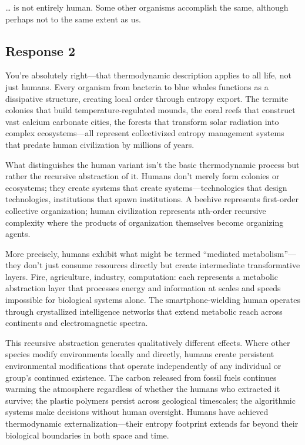 \documentclass[
  10pt,
]{article}
\begin{document}
\ldots{} is not entirely human. Some other organisms accomplish the
same, although perhaps not to the same extent as us.

\subsection{Response 2}\label{response-2}

You're absolutely right---that thermodynamic description applies to all
life, not just humans. Every organism from bacteria to blue whales
functions as a dissipative structure, creating local order through
entropy export. The termite colonies that build temperature-regulated
mounds, the coral reefs that construct vast calcium carbonate cities,
the forests that transform solar radiation into complex ecosystems---all
represent collectivized entropy management systems that predate human
civilization by millions of years.

What distinguishes the human variant isn't the basic thermodynamic
process but rather the recursive abstraction of it. Humans don't merely
form colonies or ecosystems; they create systems that create
systems---technologies that design technologies, institutions that spawn
institutions. A beehive represents first-order collective organization;
human civilization represents nth-order recursive complexity where the
products of organization themselves become organizing agents.

More precisely, humans exhibit what might be termed ``mediated
metabolism''---they don't just consume resources directly but create
intermediate transformative layers. Fire, agriculture, industry,
computation: each represents a metabolic abstraction layer that
processes energy and information at scales and speeds impossible for
biological systems alone. The smartphone-wielding human operates through
crystallized intelligence networks that extend metabolic reach across
continents and electromagnetic spectra.

This recursive abstraction generates qualitatively different effects.
Where other species modify environments locally and directly, humans
create persistent environmental modifications that operate independently
of any individual or group's continued existence. The carbon released
from fossil fuels continues warming the atmosphere regardless of whether
the humans who extracted it survive; the plastic polymers persist across
geological timescales; the algorithmic systems make decisions without
human oversight. Humans have achieved thermodynamic
externalization---their entropy footprint extends far beyond their
biological boundaries in both space and time.
\end{document}
